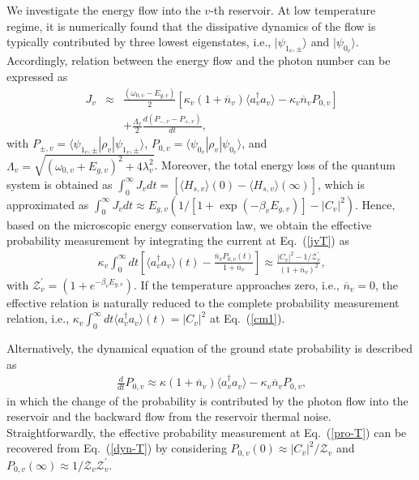\documentclass[twocolumn,showpacs,preprintnumbers,amsmath,amssymb]{revtex4}
\begin{document}
	We investigate the energy flow into the $v$-th reservoir.
	At low temperature regime, it is numerically found that the dissipative dynamics of the flow is typically contributed by three lowest eigenstates, i.e.,
	$|\psi_{1_v,\pm}{\rangle}$ and $|\psi_{0_v}{\rangle}$.
	Accordingly, relation between the energy flow and the photon number can be expressed as
\begin{eqnarray} ~\label{jvT}
J_v&\approx&\frac{(\omega_{0,v}-E_{g,v})}{2}
[\kappa_v(1+\overline{n}_v){\langle}a^\dag_v{a}_v{\rangle}-\kappa_v\overline{n}_vP_{0,v}]\nonumber\\
&&+\frac{\Lambda_v}{2}\frac{d(P_{-,v}-P_{+,v})}{dt},
\end{eqnarray}
	with $P_{\pm,v}={\langle}\psi_{1_v,\pm}|\rho_v|\psi_{1_v,\pm}\rangle$,
	$P_{0,v}={\langle}\psi_{0_v}|\rho_v|\psi_{0_v}\rangle$,
	and
	$\Lambda_v=\sqrt{(\omega_{0,v}+E_{g,v})^2+4\lambda^2_v}$.
Moreover, the total energy loss of the quantum system is obtained as
$\int^\infty_0J_vdt=[{\langle}H_{s,v}{\rangle}(0)-{\langle}H_{s,v}{\rangle}(\infty)]$,
which is approximated as
$\int^\infty_0J_vdt{\approx}E_{g,v}(1/[1+\exp(-\beta_vE_{g,v})]-|C_v|^2)$.
Hence, based on the microscopic energy conservation law,
	we obtain the effective probability measurement by integrating the current at Eq.~(\ref{jvT}) as
	\begin{eqnarray}~\label{pro-T}
    \kappa_v\int^\infty_0dt[{\langle}a^\dag_v{a}_v{\rangle}(t)-\frac{\overline{n}_vP_{0,v}(t)}{1+\overline{n}_v}]
		{\approx}\frac{|C_{{v}}|^2-1/\mathcal{Z}^\prime_v}
		{(1+\overline{n}_v)^2},
	\end{eqnarray}
with $\mathcal{Z}^\prime_v=(1+e^{-\beta_vE_{g,v}})$.
	If the temperature approaches zero, i.e., $\overline{n}_v=0$,
	the effective relation is naturally reduced to the complete probability measurement relation,
	i.e., $ \kappa_v\int^\infty_0dt{\langle}a^\dag_v{a}_v{\rangle}(t)=|C_v|^2$
	at Eq.~(\ref{cm1}).



	Alternatively, the dynamical equation of the ground state probability is described as
	\begin{eqnarray}~\label{dyn-T}
		\frac{d}{dt}P_{0,v}\approx\kappa(1+\overline{n}_v){\langle}a^\dag_v{a}_v{\rangle}
		-\kappa_v\overline{n}_vP_{0,v},
	\end{eqnarray}
	in which the change of the probability is contributed by
	the photon flow into the reservoir and the backward flow from the reservoir thermal noise.
	Straightforwardly, the effective probability measurement at Eq.~(\ref{pro-T}) can be recovered from Eq.~(\ref{dyn-T})
  	by considering
  $P_{0,v}(0){\approx}|C_{\overline{v}}|^2/\mathcal{Z}_v$
	and $P_{0,v}(\infty){\approx}1/\mathcal{Z}_v\mathcal{Z}^\prime_v$.
	
\end{document}
